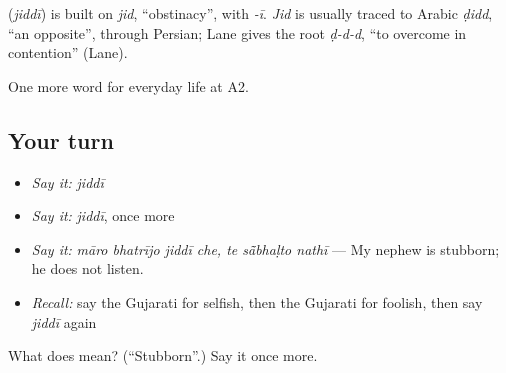 \begin{cousinweb}
\textbf{} (\emph{jiddī}) is built on \emph{jid}, \textquotedblleft{}obstinacy\textquotedblright{}, with \emph{-ī}. \emph{Jid} is usually traced to Arabic \emph{ḍidd}, \textquotedblleft{}an opposite\textquotedblright{}, through Persian; Lane gives the root \emph{ḍ-d-d}, \textquotedblleft{}to overcome in contention\textquotedblright{} (Lane).
\end{cousinweb}

\begin{grammarlens}[title={What you've built}]
One more word for everyday life at A2.
\end{grammarlens}

\subsection*{Your turn}
\begin{itemize}
\raggedright
  \item \emph{Say it:} \emph{jiddī}
  \item \emph{Say it:} \emph{jiddī}, once more
  \item \emph{Say it:} \emph{māro bhatrījo jiddī che, te sā̃bhaḷto nathī} — My nephew is stubborn; he does not listen.
  \item \emph{Recall:} say the Gujarati for selfish, then the Gujarati for foolish, then say \emph{jiddī} again
\end{itemize}

\begin{tcolorbox}[breakable,colback=teal!4,colframe=teal!35!black,title={Before you move on}]
What does  mean? (\textquotedblleft{}Stubborn\textquotedblright{}.) Say it once more.
\end{tcolorbox}
